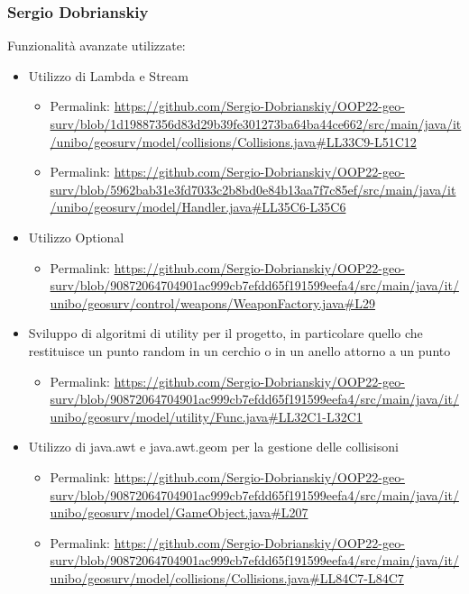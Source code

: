 \documentclass[a4paper,12pt]{report}
\begin{document}
\subsubsection{Sergio Dobrianskiy}
Funzionalità avanzate utilizzate:
 \begin{itemize}
 	\item Utilizzo di Lambda e Stream
 	 \begin{itemize}
 	 	\item Permalink: \url{https://github.com/Sergio-Dobrianskiy/OOP22-geo-surv/blob/1d19887356d83d29b39fe301273ba64ba44ce662/src/main/java/it/unibo/geosurv/model/collisions/Collisions.java#LL33C9-L51C12}
 	 	\item Permalink: \url{https://github.com/Sergio-Dobrianskiy/OOP22-geo-surv/blob/5962bab31e3fd7033c2b8bd0e84b13aa7f7c85ef/src/main/java/it/unibo/geosurv/model/Handler.java#LL35C6-L35C6}
 	 \end{itemize}
 	 
 	 \item Utilizzo Optional
 	 \begin{itemize}
 	 	\item Permalink: \url{https://github.com/Sergio-Dobrianskiy/OOP22-geo-surv/blob/90872064704901ac999cb7efdd65f191599eefa4/src/main/java/it/unibo/geosurv/control/weapons/WeaponFactory.java#L29}
 	 \end{itemize}
 	 
 	 \item Sviluppo di algoritmi di utility per il progetto, in particolare quello che restituisce un punto random in un cerchio o in un anello attorno a un punto
 	 \begin{itemize}
 	 	\item Permalink: \url{https://github.com/Sergio-Dobrianskiy/OOP22-geo-surv/blob/90872064704901ac999cb7efdd65f191599eefa4/src/main/java/it/unibo/geosurv/model/utility/Func.java#LL32C1-L32C1}
 	 \end{itemize}
 	 
	\item Utilizzo di java.awt e java.awt.geom per la gestione delle collisisoni
 	 \begin{itemize}
 	 	\item Permalink: \url{https://github.com/Sergio-Dobrianskiy/OOP22-geo-surv/blob/90872064704901ac999cb7efdd65f191599eefa4/src/main/java/it/unibo/geosurv/model/GameObject.java#L207}
 	 	\item Permalink: \url{https://github.com/Sergio-Dobrianskiy/OOP22-geo-surv/blob/90872064704901ac999cb7efdd65f191599eefa4/src/main/java/it/unibo/geosurv/model/collisions/Collisions.java#LL84C7-L84C7}
 	 \end{itemize}
\end{itemize}
\end{document}
